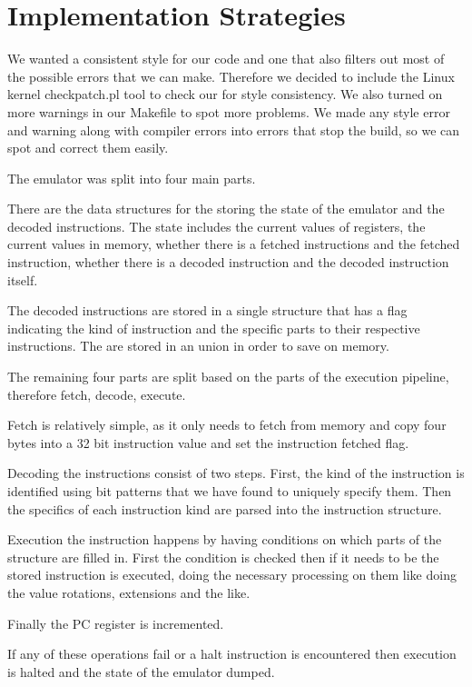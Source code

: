 \documentclass[11pt]{article}
\begin{document}
\section{Implementation Strategies}

We wanted a consistent style for our code and one that also filters out most of
the possible errors that we can make. Therefore we decided to include the Linux
kernel checkpatch.pl tool to check our for style consistency. We also turned on
more warnings in our Makefile to spot more problems. We made any style error and
warning along with compiler errors into errors that stop the build, so we can
spot and correct them easily.

The emulator was split into four main parts.

There are the data structures for the storing the state of the emulator and the
decoded instructions. The state includes the current values of registers, the
current values in memory, whether there is a fetched instructions and the
fetched instruction, whether there is a decoded instruction and the decoded
instruction itself.

The decoded instructions are stored in a single structure that has a flag
indicating the kind of instruction and the specific parts to their respective
instructions. The are stored in an union in order to save on memory.

The remaining four parts are split based on the parts of the execution pipeline,
therefore fetch, decode, execute.

Fetch is relatively simple, as it only needs to fetch from memory and copy four
bytes into a 32 bit instruction value and set the instruction fetched flag.

Decoding the instructions consist of two steps. First, the kind of the
instruction is identified using bit patterns that we have found to uniquely
specify them. Then the specifics of each instruction kind are parsed into the
instruction structure.

Execution the instruction happens by having conditions on which parts of the
structure are filled in. First the condition is checked then if it needs to be
the stored instruction is executed, doing the necessary processing on them like
doing the value rotations, extensions and the like.

Finally the PC register is incremented.

If any of these operations fail or a halt instruction is encountered then
execution is halted and the state of the emulator dumped.
\end{document}
